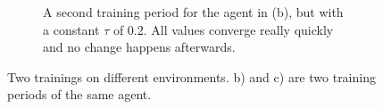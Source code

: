 \begin{figure}[hb]
\begin{center}
\begin{subfigure}[h]{.48\textwidth}
            \caption{A second training period for the agent in (b), but with a constant $\tau$ of 0.2. All values converge really quickly and no change happens afterwards. }
        \end{subfigure}
    \end{center}
\caption[Neural Network Training]{Two trainings on different environments. b) and c) are two training periods of the same agent.}
\label{fig:nntrain}

\end{figure}
